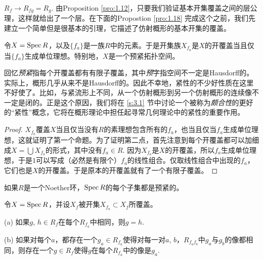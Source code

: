 $R_f\to R_{fg}=R_g$. 由Proposition \ref{pro:1.12}，只要我们验证基本开集覆盖之间的层公理，这样就给出了一个层。在下面的Propostion \ref{pro:1.18} 完成这个之前，我们先建立一个简单但是很基本的引理，它描述了仿射概形的基本开集的覆盖。

\begin{lem}\label{lem:1.16}
	令$X=\operatorname{Spec} R$，以及$\{f_a\}$是一族$R$中的元素。于是开集族$X_{f_a}$是$X$的开覆盖当且仅当$\{f_a\}$生成单位理想。特别地，$X$是一个预紧拓扑空间。
\end{lem}

回忆\textit{预紧}指每个开覆盖都有有限子覆盖，其中\textit{预}字指空间不一定是Hausdorff的。实际上，概形几乎从来不是Hausdorff的。因此不幸地，紧性的不少好性质在这里不好使了。比如，与紧流形上不同，从一个仿射概形到另一个仿射概形的连续像不一定是闭的。正是这个原因，我们将在 \ref{s:3.1} 节中讨论一个被称为\textit{颇合性}的更好的“紧性”概念，它将在概形理论中担任起寻常几何理论中的紧性的重要作用。

\begin{proof}
	$X_{f_a}$覆盖$X$当且仅当没有$R$的素理想包含所有的$f_a$，也当且仅当$f_a$生成单位理想，这就证明了第一个命题。为了证明第二点，首先注意到每个开覆盖都可以加细成$X=\bigcup X_{f_a}$的形式，其中没有$f_a\in R$. 因为$X_{f_a}$是$X$的开覆盖，所以$f_a$生成单位理想，于是$1$可以写成（必然是有限个）$f_a$的线性组合。仅取线性组合中出现的$f_a$，它们也是$X$的开覆盖。于是原本的开覆盖就有了一个有限子覆盖。
\end{proof}

\begin{exe}
	如果$R$是一个Noether环，$\operatorname{Spec} R$的每个子集都是预紧的。
\end{exe}

\begin{pro}\label{pro:1.18}
令$X=\operatorname{Spec} R$，并设$X_f$被开集$X_{f_a}\subset X_f$所覆盖。
\begin{compactitem}
\item[{\rm (a)}] 如果$g$, $h\in R_f$在每个$R_{f_a}$中相同，则$g=h$.
\item[{\rm (b)}] 如果对每个$a$，都存在一个$g_a\in R_{f_a}$使得对每一对$a$, $b$，$R_{f_af_b}$中$g_a$与$g_b$的像都相同，则存在一个$g\in R_f$使得$g$在每个$R_{f_a}$中的像是$g_a$.
\end{compactitem}
\end{pro}

